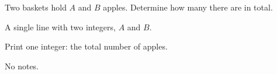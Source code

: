 
Two baskets hold $A$ and $B$ apples. Determine how many there are in total.

A single line with two integers, $A$ and $B$.

Print one integer: the total number of apples.

No notes.
